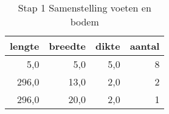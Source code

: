 \begin{table}[h!]
\centering
\caption{Stap 1 Samenstelling voeten en bodem}
\begin{tabular}{rrrr}
\toprule
 lengte &  breedte &  dikte &  aantal \\
\midrule
    5,0 &      5,0 &    5,0 &       8 \\
  296,0 &     13,0 &    2,0 &       2 \\
  296,0 &     20,0 &    2,0 &       1 \\
\bottomrule
\end{tabular}
\end{table}
